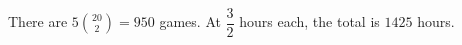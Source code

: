 There are $5\binom{20}{2}=950$ games. At $\dfrac{3}{2}$ hours each, the total is $\boxed{1425}$ hours.
